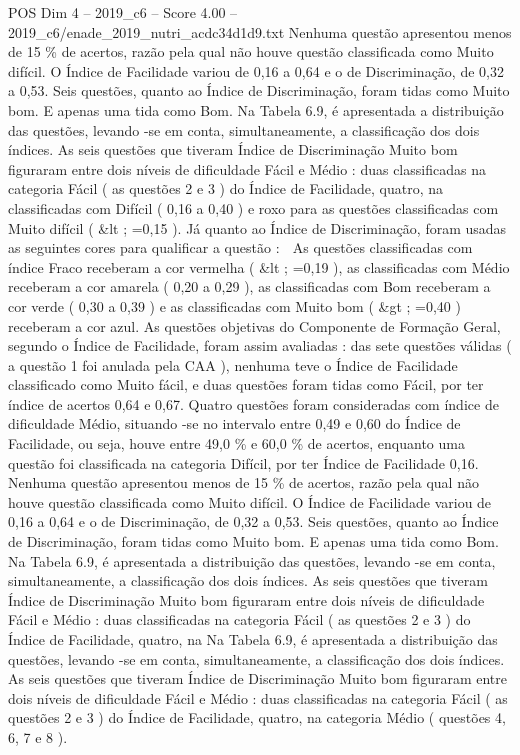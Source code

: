 \begin{textsample}{POS Dim 4 – 2019\_c6 – Score 4.00 – 2019\_c6/enade\_2019\_nutri\_acdc34d1d9.txt}
Nenhuma questão apresentou menos de 15 \% de acertos, razão pela qual não houve questão classificada como Muito difícil.
O Índice de Facilidade variou de 0,16 a 0,64 e o de Discriminação, de 0,32 a 0,53.
Seis questões, quanto ao Índice de Discriminação, foram tidas como Muito bom.
E apenas uma tida como Bom.
Na Tabela 6.9, é apresentada a distribuição das questões, levando -se em conta, simultaneamente, a classificação dos dois índices.
As seis questões que tiveram Índice de Discriminação Muito bom figuraram entre dois níveis de dificuldade Fácil e Médio : duas classificadas na categoria Fácil ( as questões 2 e 3 ) do Índice de Facilidade, quatro, na classificadas com Difícil ( 0,16 a 0,40 ) e roxo para as questões classificadas com Muito difícil ( \&lt ; =0,15 ).
Já quanto ao Índice de Discriminação, foram usadas as seguintes cores para qualificar a questão :  As questões classificadas com índice Fraco receberam a cor vermelha ( \&lt ; =0,19 ), as classificadas com Médio receberam a cor amarela ( 0,20 a 0,29 ), as classificadas com Bom receberam a cor verde ( 0,30 a 0,39 ) e as classificadas com Muito bom ( \&gt ; =0,40 ) receberam a cor azul.
As questões objetivas do Componente de Formação Geral, segundo o Índice de Facilidade, foram assim avaliadas : das sete questões válidas ( a questão 1 foi anulada pela CAA ), nenhuma teve o Índice de Facilidade classificado como Muito fácil, e duas questões foram tidas como Fácil, por ter índice de acertos 0,64 e 0,67.
Quatro questões foram consideradas com índice de dificuldade Médio, situando -se no intervalo entre 0,49 e 0,60 do Índice de Facilidade, ou seja, houve entre 49,0 \% e 60,0 \% de acertos, enquanto uma questão foi classificada na categoria Difícil, por ter Índice de Facilidade 0,16.
Nenhuma questão apresentou menos de 15 \% de acertos, razão pela qual não houve questão classificada como Muito difícil.
O Índice de Facilidade variou de 0,16 a 0,64 e o de Discriminação, de 0,32 a 0,53.
Seis questões, quanto ao Índice de Discriminação, foram tidas como Muito bom.
E apenas uma tida como Bom.
Na Tabela 6.9, é apresentada a distribuição das questões, levando -se em conta, simultaneamente, a classificação dos dois índices.
As seis questões que tiveram Índice de Discriminação Muito bom figuraram entre dois níveis de dificuldade Fácil e Médio : duas classificadas na categoria Fácil ( as questões 2 e 3 ) do Índice de Facilidade, quatro, na Na Tabela 6.9, é apresentada a distribuição das questões, levando -se em conta, simultaneamente, a classificação dos dois índices.
As seis questões que tiveram Índice de Discriminação Muito bom figuraram entre dois níveis de dificuldade Fácil e Médio : duas classificadas na categoria Fácil ( as questões 2 e 3 ) do Índice de Facilidade, quatro, na categoria Médio ( questões 4, 6, 7 e 8 ).

\end{textsample}
